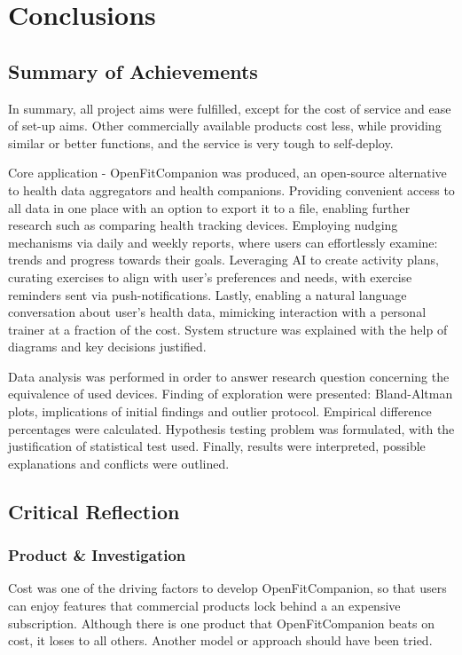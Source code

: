 \chapter{Conclusions}
\label{cha:evaluation}
\section{Summary of Achievements}
In summary, all project aims were fulfilled, except for the cost of service and ease of set-up aims. Other commercially available products cost less, while providing similar or better functions, and the service is very tough to self-deploy.

Core application - OpenFitCompanion was produced, an open-source alternative to health data aggregators and health companions. Providing convenient access to all data in one place with an option to export it to a file, enabling further research such as comparing health tracking devices. Employing nudging mechanisms via daily and weekly reports, where users can effortlessly examine: trends and progress towards their goals. Leveraging AI to create activity plans, curating exercises to align with user's preferences and needs, with exercise reminders sent via push-notifications. Lastly, enabling a natural language conversation about user's health data, mimicking interaction with a personal trainer at a fraction of the cost. System structure was explained with the help of diagrams and key decisions justified. 

Data analysis was performed in order to answer research question concerning the equivalence of used devices. Finding of exploration were presented: Bland-Altman plots, implications of initial findings and outlier protocol. Empirical difference percentages were calculated. Hypothesis testing problem was formulated, with the justification of statistical test used. Finally, results were interpreted, possible explanations and conflicts were outlined.  
\section{Critical Reflection}
\subsection{Product \& Investigation}
Cost was one of the driving factors to develop OpenFitCompanion, so that users can enjoy features that commercial products lock behind a an expensive subscription. Although there is one product that OpenFitCompanion beats on cost, it loses to all others. Another model or approach should have been tried. 

